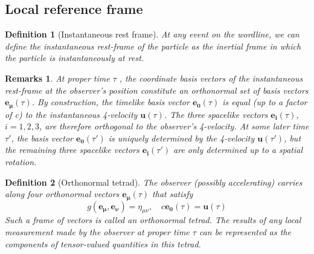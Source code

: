 \documentclass[a4paper]{article}
\newtheorem{remarks}{Remarks}[section]
\theoremstyle{new}
\newtheorem{defi}{Definition}[section]
\begin{document}
\subsection{Local reference frame}
\begin{defi}[Instantaneous rest frame]
At any event on the wordline, we can define the instantaneous rest-frame of the particle as the inertial frame in which the particle is instantaneously at rest.
\end{defi}
\begin{remarks}
At proper time $\tau$ , the coordinate basis vectors of the instantaneous rest-frame at the observer’s position constitute an orthonormal set of basis vectors $\mathbf{e_\mu}(\tau)$. By construction, the timelike basis vector $\mathbf{e_0}(\tau)$ is equal (up to a factor of c) to the instantaneous 4-velocity $\mathbf{u}(\tau)$. The three spacelike vectors $\mathbf{e_i}(\tau)$, $i = 1, 2, 3$, are therefore orthogonal to the observer’s 4-velocity. At some later time $\tau'$, the basis vector $\mathbf{e_0}(\tau')$ is uniquely determined by the 4-velocity $\mathbf{u}(\tau')$, but the remaining three spacelike vectors $\mathbf{e_i}(\tau')$ are only determined up to a spatial rotation.
\end{remarks}
\begin{defi}[Orthonormal tetrad]
The observer (possibly accelerating) carries along four orthonormal vectors $\mathbf{e_\mu}(\tau)$ that satisfy
$$g(\mathbf{e_\mu},\mathbf{e_\nu})=\eta_{\mu\nu},\quad c\mathbf{e_0}(\tau)=\mathbf{u}(\tau)$$
Such a frame of vectors is called an orthonormal tetrad. The results of any local measurement made by the observer at proper time $\tau$ can be represented as the components of tensor-valued quantities in this tetrad.
\end{defi}
\end{document}
